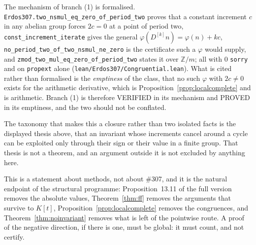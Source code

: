 \documentclass[11pt]{article}
\theoremstyle{definition}
\begin{document}
The mechanism of branch (1) is formalised. \texttt{Erdos307.two\_nsmul\_eq\_zero\_of\_period\_two}
proves that a constant increment $c$ in any abelian group forces $2c=0$ at a point of period two,
\texttt{const\_increment\_iterate} gives the general $\varphi(D^{[k]}n)=\varphi(n)+kc$,
\texttt{no\_period\_two\_of\_two\_nsmul\_ne\_zero} is the certificate such a $\varphi$ would supply,
and \texttt{zmod\_two\_mul\_eq\_zero\_of\_period\_two} states it over $\mathbb{Z}/m$; all with $0$
\texttt{sorry} and on \texttt{propext} alone
\textup{(\texttt{lean/Erdos307/Congruential.lean})}. What is cited rather than formalised is the
\emph{emptiness} of the class, that no such $\varphi$ with $2c\neq0$ exists for the arithmetic
derivative, which is Proposition~\ref{prop:localcomplete} and is arithmetic. Branch (1) is therefore
\textup{VERIFIED} in its mechanism and \textup{PROVED} in its emptiness, and the two should not be
conflated.

The taxonomy that makes this a closure rather than two isolated facts is the displayed thesis above,
that an invariant whose increments cancel around a cycle can be exploited only through their sign or
their value in a finite group. That thesis is not a theorem, and an argument outside it is not
excluded by anything here.

This is a statement about methods, not about \#307, and it is the natural endpoint of the structural
programme: Proposition~13.11 of the full version removes the absolute values, Theorem~\ref{thm:ff} removes
the arguments that survive to $K[t]$, Proposition~\ref{prop:localcomplete} removes the congruences,
and Theorem~\ref{thm:noinvariant} removes what is left of the pointwise route. A proof of the
negative direction, if there is one, must be global: it must count, and not certify.
\end{document}
